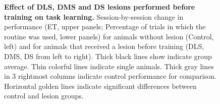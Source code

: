 \begin{figure}[bth!]
  \begin{center}
	\caption[Effects of Striatal Lesions on Learning]
	{\textbf{Effect of DLS, DMS and DS lesions performed before training on task learning.}
	Session-by-session change in performance (ET, upper panels; Percentage of trials in which the routine was used, lower panels) for animals without lesion (Control, left) and for animals that received a lesion before training (DLS, DMS, DS from left to right). 
	Thick black lines show indicate group average.
    Thin colorful lines indicate single animals.
    Thick gray lines in 3 rightmost columns indicate control performance for comparison.
    Horizontal golden lines indicate significant differences between control and lesion groups. 
	}
	\label{fig:lesion:EarlyLesionLearning}
  \end{center}
\end{figure}